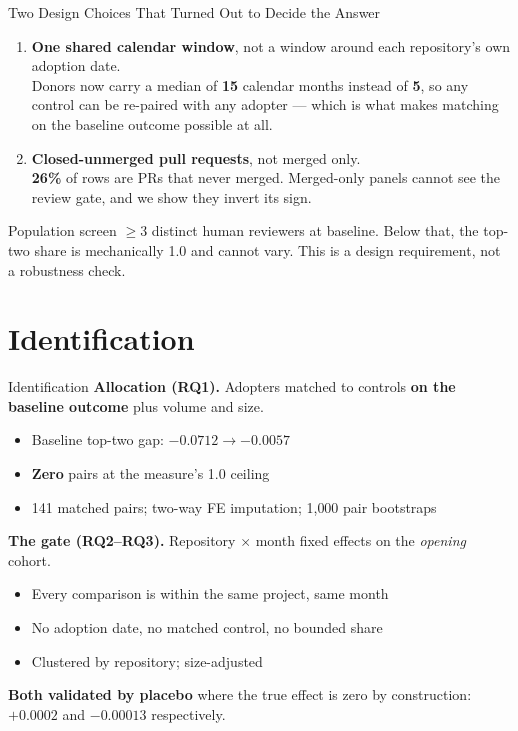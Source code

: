 \begin{frame}{Two Design Choices That Turned Out to Decide the Answer}
\begin{enumerate}
  \item \textbf{One shared calendar window}, not a window around each
        repository's own adoption date.\\
        Donors now carry a median of \textbf{15} calendar months instead of
        \textbf{5}, so any control can be re-paired with any adopter --- which
        is what makes matching on the baseline outcome possible at all.
  \item \textbf{Closed-unmerged pull requests}, not merged only.\\
        \textbf{26\%} of rows are PRs that never merged. Merged-only panels
        cannot see the review gate, and we show they invert its sign.
\end{enumerate}
\vfill
\begin{block}{Population screen}
  $\geq 3$ distinct human reviewers at baseline. Below that, the top-two
  share is mechanically 1.0 and cannot vary. This is a design requirement,
  not a robustness check.
\end{block}
\end{frame}

\section{Identification}

\begin{frame}{Identification}
\textbf{Allocation (RQ1).} Adopters matched to controls \textbf{on the
baseline outcome} plus volume and size.
\begin{itemize}\small
  \item Baseline top-two gap: $-0.0712 \rightarrow \mathbf{-0.0057}$
  \item \textbf{Zero} pairs at the measure's 1.0 ceiling
  \item 141 matched pairs; two-way FE imputation; 1{,}000 pair bootstraps
\end{itemize}
\vspace{0.5em}
\textbf{The gate (RQ2--RQ3).} Repository $\times$ month fixed effects on the
\emph{opening} cohort.
\begin{itemize}\small
  \item Every comparison is within the same project, same month
  \item No adoption date, no matched control, no bounded share
  \item Clustered by repository; size-adjusted
\end{itemize}
\vspace{0.5em}
\textbf{Both validated by placebo} where the true effect is zero by
construction: $+0.0002$ and $-0.00013$ respectively.
\end{frame}

